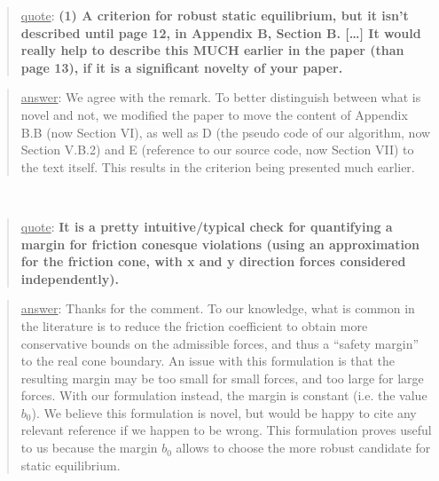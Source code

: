 \documentclass[a4paper]{article}
\newcommand{\done}[0]{}
\newcommand\quot[1]{\begin{quote} \underline{quote}: \textbf{#1}\end{quote}}
\newcommand\as[1]{\begin{quote} \underline{answer}: {#1}\end{quote} }
\newcommand\jp{ \leavevmode \\}
\begin{document}

\quot { (1) A criterion for robust static equilibrium, but it isn't
described until page 12, in Appendix B, Section B. [\dots]  It would really help to describe this MUCH earlier in
the paper (than page 13), if it is a significant novelty of your paper.}

\as{We agree with the remark. To better distinguish between what is novel and not, we modified the paper to move the content of Appendix B.B (now Section VI), as well as D  (the pseudo code of our algorithm, now Section V.B.2) and E (reference to our source code, now Section VII) to the text itself. This results in the criterion being presented much earlier.}\done \jp

\quot{It is a pretty intuitive/typical check for quantifying a
margin for friction conesque violations (using an approximation for
the friction cone, with x and y direction forces considered
independently). }

\as{Thanks for the comment. To our knowledge, what is common in the literature is to reduce the friction coefficient to obtain more conservative bounds on the admissible forces, and thus a ``safety margin'' to the real cone boundary. An issue with this formulation is that the resulting margin may be too small for small forces, and too large for large forces. With our formulation instead, the margin is constant (i.e. the value $b_0$). We believe this formulation is novel, but would be happy to cite any relevant reference if we happen to be wrong. This formulation proves useful to us because the margin $b_0$ allows to choose the more robust candidate for static equilibrium.}\done
\end{document}
